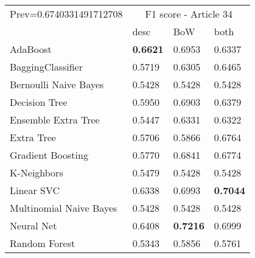\begin{tabular}{|l|l|l|l| }
\hline
Prev=0.6740331491712708 &  \multicolumn{3}{c|}{F1 score - Article 34} \\
\cline{2-4} & desc & BoW & both \\ \hline
AdaBoost                & {\bf 0.6621} & 0.6953 & 0.6337\\
BaggingClassifier       & 0.5719 & 0.6305 & 0.6465\\
Bernoulli Naive Bayes   & 0.5428 & 0.5428 & 0.5428\\
Decision Tree           & 0.5950 & 0.6903 & 0.6379\\
Ensemble Extra Tree     & 0.5447 & 0.6331 & 0.6322\\
Extra Tree              & 0.5706 & 0.5866 & 0.6764\\
Gradient Boosting       & 0.5770 & 0.6841 & 0.6774\\
K-Neighbors             & 0.5479 & 0.5428 & 0.5428\\
Linear SVC              & 0.6338 & 0.6993 & {\bf 0.7044}\\
Multinomial Naive Bayes & 0.5428 & 0.5428 & 0.5428\\
Neural Net              & 0.6408 & {\bf 0.7216} & 0.6999\\
Random Forest           & 0.5343 & 0.5856 & 0.5761\\
\hline
\end{tabular}